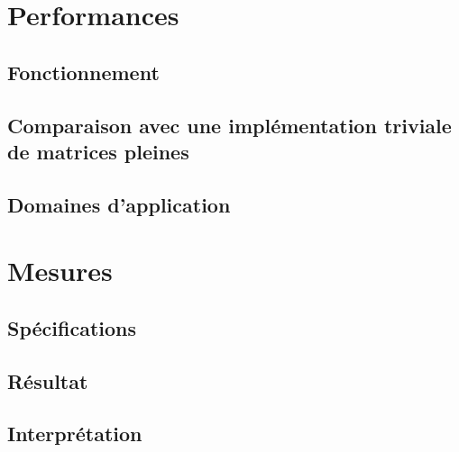 \documentclass[12pt,a4paper]{article}
\begin{document}

\clearpage
\thispagestyle{empty}
\tableofcontents
\clearpage
{}


\section{Performances}
\subsection{Fonctionnement}
\subsection{Comparaison avec une implémentation triviale de matrices pleines}
\subsection{Domaines d'application}

\section{Mesures}
\subsection{Spécifications}
\subsection{Résultat}
\subsection{Interprétation}
\end{document}

